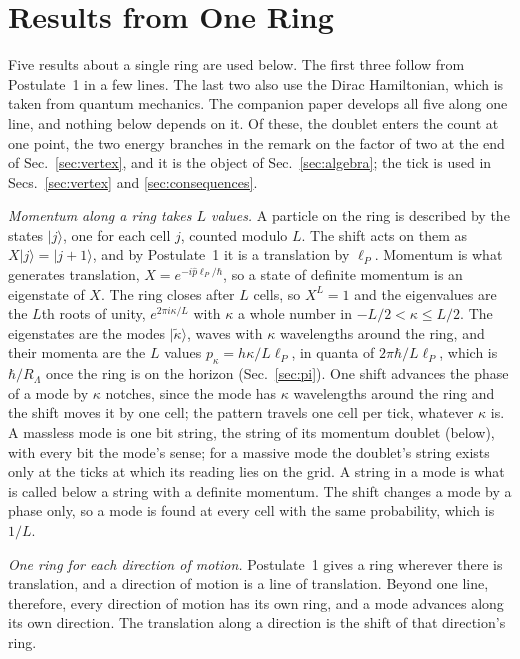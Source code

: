 \documentclass[aps,prd,twocolumn,superscriptaddress,nofootinbib]{revtex4-2}
\begin{document}
\section{Results from One Ring}
\label{sec:register}

Five results about a single ring are used below. The first three follow from Postulate~1 in a few lines. The last two also use the Dirac Hamiltonian, which is taken from quantum mechanics. The companion paper develops all five along one line, and nothing below depends on it. Of these, the doublet enters the count at one point, the two energy branches in the remark on the factor of two at the end of Sec.~\ref{sec:vertex}, and it is the object of Sec.~\ref{sec:algebra}; the tick is used in Secs.~\ref{sec:vertex} and \ref{sec:consequences}.

\textit{Momentum along a ring takes $L$ values.} A particle on the ring is described by the states $|j\rangle$, one for each cell $j$, counted modulo $L$. The shift acts on them as $X|j\rangle = |j+1\rangle$, and by Postulate~1 it is a translation by $\ell_P$. Momentum is what generates translation, $X = e^{-i\hat p\ell_P/\hbar}$, so a state of definite momentum is an eigenstate of $X$. The ring closes after $L$ cells, so $X^L = 1$ and the eigenvalues are the $L$th roots of unity, $e^{2\pi i\kappa/L}$ with $\kappa$ a whole number in $-L/2 < \kappa \le L/2$. The eigenstates are the modes $|\tilde\kappa\rangle$, waves with $\kappa$ wavelengths around the ring, and their momenta are the $L$ values $p_\kappa = h\kappa/L\ell_P$, in quanta of $2\pi\hbar/L\ell_P$, which is $\hbar/R_\Lambda$ once the ring is on the horizon (Sec.~\ref{sec:pi}). One shift advances the phase of a mode by $\kappa$ notches, since the mode has $\kappa$ wavelengths around the ring and the shift moves it by one cell; the pattern travels one cell per tick, whatever $\kappa$ is. A massless mode is one bit string, the string of its momentum doublet (below), with every bit the mode's sense; for a massive mode the doublet's string exists only at the ticks at which its reading lies on the grid. A string in a mode is what is called below a string with a definite momentum. The shift changes a mode by a phase only, so a mode is found at every cell with the same probability, which is $1/L$.

\textit{One ring for each direction of motion.} Postulate~1 gives a ring wherever there is translation, and a direction of motion is a line of translation. Beyond one line, therefore, every direction of motion has its own ring, and a mode advances along its own direction. The translation along a direction is the shift of that direction's ring.
\end{document}
